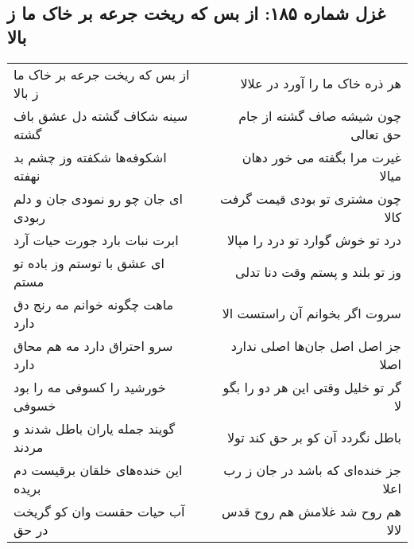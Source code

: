 \begin{center}
\section*{غزل شماره ۱۸۵: از بس که ریخت جرعه بر خاک ما ز بالا}
\label{sec:0185}
\begin{longtable}{l p{0.5cm} r}
از بس که ریخت جرعه بر خاک ما ز بالا
&&
هر ذره خاک ما را آورد در علالا
\\
سینه شکاف گشته دل عشق باف گشته
&&
چون شیشه صاف گشته از جام حق تعالی
\\
اشکوفه‌ها شکفته وز چشم بد نهفته
&&
غیرت مرا بگفته می خور دهان میالا
\\
ای جان چو رو نمودی جان و دلم ربودی
&&
چون مشتری تو بودی قیمت گرفت کالا
\\
ابرت نبات بارد جورت حیات آرد
&&
درد تو خوش گوارد تو درد را مپالا
\\
ای عشق با توستم وز باده تو مستم
&&
وز تو بلند و پستم وقت دنا تدلی
\\
ماهت چگونه خوانم مه رنج دق دارد
&&
سروت اگر بخوانم آن راستست الا
\\
سرو احتراق دارد مه هم محاق دارد
&&
جز اصل اصل جان‌ها اصلی ندارد اصلا
\\
خورشید را کسوفی مه را بود خسوفی
&&
گر تو خلیل وقتی این هر دو را بگو لا
\\
گویند جمله یاران باطل شدند و مردند
&&
باطل نگردد آن کو بر حق کند تولا
\\
این خنده‌های خلقان برقیست دم بریده
&&
جز خنده‌ای که باشد در جان ز رب اعلا
\\
آب حیات حقست وان کو گریخت در حق
&&
هم روح شد غلامش هم روح قدس لالا
\\
\end{longtable}
\end{center}
